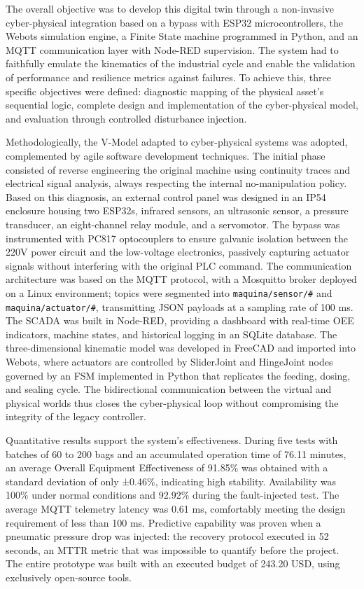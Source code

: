 The overall objective was to develop this digital twin through a non-invasive cyber-physical integration based on a bypass with ESP32 microcontrollers, the Webots simulation engine, a Finite State machine programmed in Python, and an MQTT communication layer with Node-RED supervision. The system had to faithfully emulate the kinematics of the industrial cycle and enable the validation of performance and resilience metrics against failures. To achieve this, three specific objectives were defined: diagnostic mapping of the physical asset's sequential logic, complete design and implementation of the cyber-physical model, and evaluation through controlled disturbance injection.

Methodologically, the V-Model adapted to cyber-physical systems was adopted, complemented by agile software development techniques. The initial phase consisted of reverse engineering the original machine using continuity traces and electrical signal analysis, always respecting the internal no-manipulation policy. Based on this diagnosis, an external control panel was designed in an IP54 enclosure housing two ESP32s, infrared sensors, an ultrasonic sensor, a pressure transducer, an eight-channel relay module, and a servomotor. The bypass was instrumented with PC817 optocouplers to ensure galvanic isolation between the 220V power circuit and the low-voltage electronics, passively capturing actuator signals without interfering with the original PLC command. The communication architecture was based on the MQTT protocol, with a Mosquitto broker deployed on a Linux environment; topics were segmented into \texttt{maquina/sensor/\#} and \texttt{maquina/actuator/\#}, transmitting JSON payloads at a sampling rate of 100 ms. The SCADA was built in Node-RED, providing a dashboard with real-time OEE indicators, machine states, and historical logging in an SQLite database. The three-dimensional kinematic model was developed in FreeCAD and imported into Webots, where actuators are controlled by SliderJoint and HingeJoint nodes governed by an FSM implemented in Python that replicates the feeding, dosing, and sealing cycle. The bidirectional communication between the virtual and physical worlds thus closes the cyber-physical loop without compromising the integrity of the legacy controller.

Quantitative results support the system's effectiveness. During five tests with batches of 60 to 200 bags and an accumulated operation time of 76.11 minutes, an average Overall Equipment Effectiveness of 91.85\% was obtained with a standard deviation of only ±0.46\%, indicating high stability. Availability was 100\% under normal conditions and 92.92\% during the fault-injected test. The average MQTT telemetry latency was 0.61 ms, comfortably meeting the design requirement of less than 100 ms. Predictive capability was proven when a pneumatic pressure drop was injected: the recovery protocol executed in 52 seconds, an MTTR metric that was impossible to quantify before the project. The entire prototype was built with an executed budget of 243.20 USD, using exclusively open-source tools.

